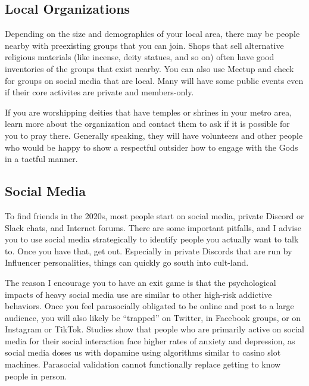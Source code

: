 \documentclass[
]{book}
\begin{document}
\hypertarget{local-organizations}{%
\subsection{Local Organizations}\label{local-organizations}}

Depending on the size and demographics of your local area, there may be people nearby with preexisting groups that you can join. Shops that sell alternative religious materials (like incense, deity statues, and so on) often have good inventories of the groups that exist nearby. You can also use Meetup and check for groups on social media that are local. Many will have some public events even if their core activites are private and members-only.

If you are worshipping deities that have temples or shrines in your metro area, learn more about the organization and contact them to ask if it is possible for you to pray there. Generally speaking, they will have volunteers and other people who would be happy to show a respectful outsider how to engage with the Gods in a tactful manner.

\hypertarget{social-media}{%
\subsection{Social Media}\label{social-media}}

To find friends in the 2020s, most people start on social media, private Discord or Slack chats, and Internet forums. There are some important pitfalls, and I advise you to use social media strategically to identify people you actually want to talk to. Once you have that, get out. Especially in private Discords that are run by Influencer personalities, things can quickly go south into cult-land.

The reason I encourage you to have an exit game is that the psychological impacts of heavy social media use are similar to other high-risk addictive behaviors. Once you feel parasocially obligated to be online and post to a large audience, you will also likely be ``trapped'' on Twitter, in Facebook groups, or on Instagram or TikTok. Studies show that people who are primarily active on social media for their social interaction face higher rates of anxiety and depression, as social media doses us with dopamine using algorithms similar to casino slot machines. Parasocial validation cannot functionally replace getting to know people in person.
\end{document}
